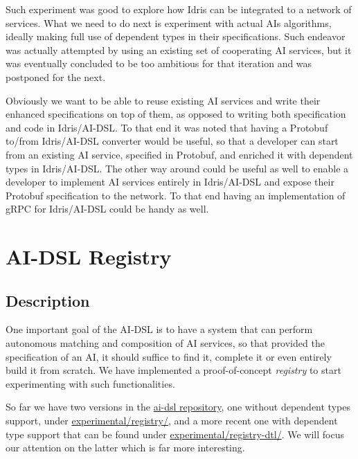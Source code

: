 \documentclass[]{report}
\newcommand{\nil}[2][]{\todo[color=purple,author=nil, #1]{#2}}
\begin{document}
Such experiment was good to explore how Idris can be integrated to a
network of services.  What we need to do next is experiment with
actual AIs algorithms, ideally making full use of dependent types in
their specifications.  Such endeavor was actually attempted by using
an existing set of cooperating AI services\nil{Ref to Kabir's fake
  news detector}, but it was eventually concluded to be too ambitious
for that iteration and was postponed for the next.

Obviously we want to be able to reuse existing AI services and write
their enhanced specifications on top of them, as opposed to writing
both specification and code in Idris/AI-DSL.  To that end it was noted
that having a Protobuf to/from Idris/AI-DSL converter would be useful,
so that a developer can start from an existing AI service, specified
in Protobuf, and enriched it with dependent types in Idris/AI-DSL.
The other way around could be useful as well to enable a developer to
implement AI services entirely in Idris/AI-DSL and expose their
Protobuf specification to the network.  To that end having an
implementation of gRPC for Idris/AI-DSL could be handy as well.

\section{AI-DSL Registry}
\label{aidsl_registry}

\subsection{Description}

One important goal of the AI-DSL is to have a system that can perform
autonomous matching and composition of AI services, so that provided
the specification of an AI, it should suffice to find it, complete it
or even entirely build it from scratch.  We have implemented a
proof-of-concept \emph{registry} to start experimenting with such
functionalities.

So far we have two versions in the
\href{https://github.com/singnet/ai-dsl/}{ai-dsl repository}, one
without dependent types support, under
\href{https://github.com/singnet/ai-dsl/blob/master/experimental/realized-function/}{experimental/registry/},
and a more recent one with dependent type support that can be found
under
\href{https://github.com/singnet/ai-dsl/blob/master/experimental/registry-dtl/}{experimental/registry-dtl/}.
We will focus our attention on the latter which is far more
interesting.\\
\end{document}
